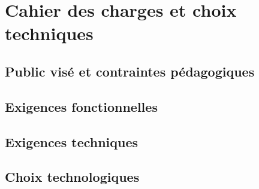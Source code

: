 
\chapter{Cahier des charges et choix techniques}\label{chap:cahier}

\section{Public visé et contraintes pédagogiques}

\section{Exigences fonctionnelles}

\section{Exigences techniques}

\section{Choix technologiques}
